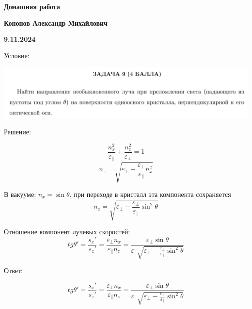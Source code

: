 \documentclass[12pt]{article}
\begin{document}
\begin{large}
\begin{center}
\LARGE \textbf{Домашняя работа}
\par
\LARGE \textbf{Кононов Александр Михайлович}
\par
    \textbf{9.11.2024}
\end{center}
\par Условие:
\par
\includegraphics[width=1\textwidth]{photo.png}
\par Решение:
\par
\par
\par
\[
    \frac{n_x^2}{\varepsilon_{\parallel}} + \frac{n_z^2}{\varepsilon_{\perp}} = 1
\]
\[
    n_z = \sqrt{\varepsilon_{\perp} - \frac{\varepsilon_{\perp}}{\varepsilon_{\parallel}} n_x^2 }
\]
\par В вакууме: $n_x = \sin \theta$, при переходе в кристалл эта компонента сохраняется
\[
    n_z = \sqrt{\varepsilon_{\perp} - \frac{\varepsilon_{\perp}}{\varepsilon_{\parallel}} \sin^2 \theta}
\]
\par Отношение компонент лучевых скоростей:
\[
    tg \theta' = \frac{s_x'}{s_z'} = \frac{\varepsilon_{\perp} n_x}{\varepsilon_{\parallel} n_z} = \frac{\varepsilon_{\perp} \sin \theta}{\varepsilon_{\parallel} \sqrt{\varepsilon_{\perp} - \frac{\varepsilon_{\perp}}{\varepsilon_{\parallel}} \sin^2 \theta}}
\]
\par Ответ:

\[
    tg \theta' = \frac{s_x'}{s_z'} = \frac{\varepsilon_{\perp} n_x}{\varepsilon_{\parallel} n_z} = \frac{\varepsilon_{\perp} \sin \theta}{\varepsilon_{\parallel} \sqrt{\varepsilon_{\perp} - \frac{\varepsilon_{\perp}}{\varepsilon_{\parallel}} \sin^2 \theta}}
\]

\end{large}
\end{document}
